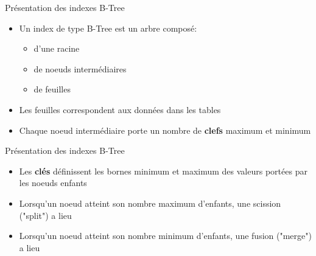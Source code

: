 
\begin{frame}[fragile]{Présentation des indexes B-Tree}

   \begin{itemize}
      \item Un index de type B-Tree est un arbre composé:
      \begin{itemize}
         \item d'une racine
         \item de noeuds intermédiaires
         \item de feuilles
      \end{itemize}
      \item Les feuilles correspondent aux données dans les tables
      \item Chaque noeud intermédiaire porte un nombre de \textbf{clefs} maximum et minimum

   \end{itemize}

\begin{toile}
\end{toile}

\end{frame}


\begin{frame}[fragile]{Présentation des indexes B-Tree}

   \begin{itemize}
      \item Les \textbf{clés} définissent les bornes minimum et maximum des valeurs portées par les noeuds enfants
      \item Lorsqu'un noeud atteint son nombre maximum d'enfants, une scission ("split") a lieu
      \item Lorsqu'un noeud atteint son nombre minimum d'enfants, une fusion ("merge") a lieu

   \end{itemize}

\end{frame}


